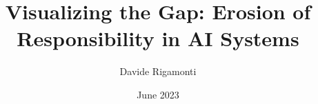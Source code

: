 \documentclass{article}
\title{Visualizing the Gap: Erosion of Responsibility in AI Systems}
\author{Davide Rigamonti}
\date{June 2023}
\begin{document}
\maketitle




\begin{multicols}{2}

    

    

    

    

    

    

    

    \printbibliography

\end{multicols}
\end{document}
